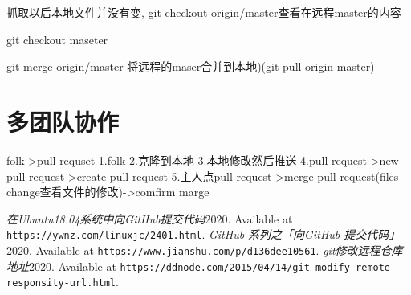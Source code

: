 \documentclass{article}
\begin{document}
          抓取以后本地文件并没有变,
          git checkout origin/master查看在远程master的内容

          git checkout maseter
          
          git merge origin/master 将远程的maser合并到本地)(git pull origin master)


          \section{多团队协作}
          folk->pull requset
          1.folk
          2.克隆到本地
          3.本地修改然后推送
          4.pull request->new pull request->create pull request
          5.主人点pull request->merge pull request(files change查看文件的修改)->comfirm marge
          
          
          
          

          

          
	\begin{thebibliography}{99}
		\emph{在Ubuntu18.04系统中向GitHub提交代码}2020.
		Available at \texttt{https://ywnz.com/linuxjc/2401.html}.
		\emph{GitHub 系列之「向GitHub 提交代码」}2020.
		Available at \texttt{https://www.jianshu.com/p/d136dee10561}.
		\emph{git修改远程仓库地址}2020.
		Available at
		\texttt{https://ddnode.com/2015/04/14/git-modify-remote-responsity-url.html}.
	\end{thebibliography}
	
	
\end{document}
